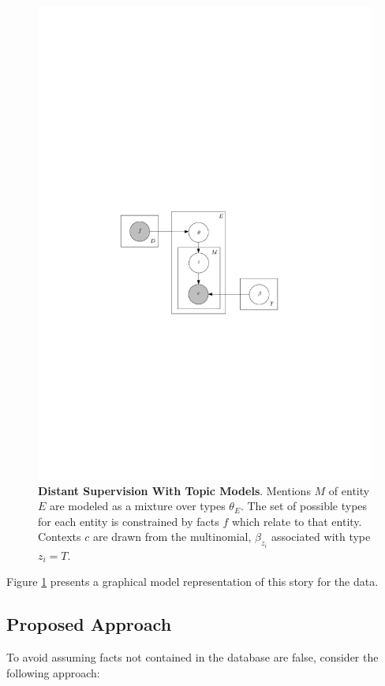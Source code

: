 \documentclass[12pt]{article}
\begin{document}
\begin{figure}
  \centering
  \includegraphics{llda.pdf}
  \caption{{\bf Distant Supervision With Topic Models}.  Mentions $M$ of entity $E$ are modeled as a mixture over types $\theta_E$.  The set of possible types
  for each entity is constrained by facts $f$ which relate to that entity.  Contexts $c$ are drawn from the multinomial, $\beta_{z_i}$ associated with type $z_i=T$.}
  \label{llda}
\end{figure}

Figure \ref{llda} presents a graphical model representation of this story for the data.


\subsection{Proposed Approach}
To avoid assuming facts not contained in the database are false, consider the following approach:
\end{document}

